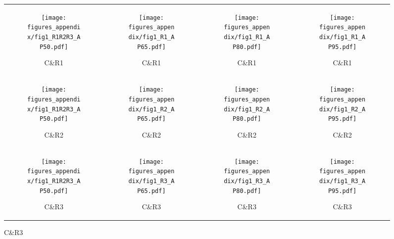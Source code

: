 \documentclass{article}
\begin{document}
\begin{figure}
\centering
\begin{tabular}{cccc}
\begin{subfigure}{0.20\textwidth}
\texttt{[image: figures\_appendix/fig1\_R1R2R3\_AP50.pdf]}
\caption{C\&R1 }\label{fig:pr_1}
\end{subfigure}&
\begin{subfigure}{0.20\textwidth}
\texttt{[image: figures\_appendix/fig1\_R1\_AP65.pdf]}
\caption{C\&R1 }\label{fig:pr_2}
\end{subfigure}&
\begin{subfigure}{0.20\textwidth}
\texttt{[image: figures\_appendix/fig1\_R1\_AP80.pdf]}
\caption{C\&R1 }\label{fig:pr_3}
\end{subfigure}&
\begin{subfigure}{0.20\textwidth}
\texttt{[image: figures\_appendix/fig1\_R1\_AP95.pdf]}
\caption{C\&R1 }\label{fig:pr_4}
\end{subfigure}\\

\begin{subfigure}{0.20\textwidth}
\texttt{[image: figures\_appendix/fig1\_R1R2R3\_AP50.pdf]}
\caption{C\&R2 }\label{fig:pr_5}
\end{subfigure}&
\begin{subfigure}{0.20\textwidth}
\texttt{[image: figures\_appendix/fig1\_R2\_AP65.pdf]}
\caption{C\&R2 }\label{fig:pr_6}
\end{subfigure}&
\begin{subfigure}{0.20\textwidth}
\texttt{[image: figures\_appendix/fig1\_R2\_AP80.pdf]}
\caption{C\&R2 }\label{fig:pr_7}
\end{subfigure}&
\begin{subfigure}{0.20\textwidth}
\texttt{[image: figures\_appendix/fig1\_R2\_AP95.pdf]}
\caption{C\&R2 }\label{fig:pr_8}
\end{subfigure}\\

\begin{subfigure}{0.20\textwidth}
\texttt{[image: figures\_appendix/fig1\_R1R2R3\_AP50.pdf]}
\caption{C\&R3 }\label{fig:pr_9}
\end{subfigure}&
\begin{subfigure}{0.20\textwidth}
\texttt{[image: figures\_appendix/fig1\_R3\_AP65.pdf]}
\caption{C\&R3 }\label{fig:pr_10}
\end{subfigure}&
\begin{subfigure}{0.20\textwidth}
\texttt{[image: figures\_appendix/fig1\_R3\_AP80.pdf]}
\caption{C\&R3 }\label{fig:pr_11}
\end{subfigure}&
\begin{subfigure}{0.20\textwidth}
\texttt{[image: figures\_appendix/fig1\_R3\_AP95.pdf]}
\caption{C\&R3 }\label{fig:pr_12}
\end{subfigure}\\
\end{tabular}


\end{figure}
\end{document}
